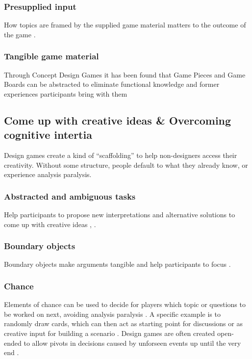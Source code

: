 \documentclass[draft,twoside]{vutinfth}
\begin{document}
            \subsubsection{Presupplied input}
            How topics are framed by the supplied game material matters to the outcome of the game \cite{brandtFormattingDesignDialogues2008}. 

            \subsubsection{Tangible game material}
            Through Concept Design Games it has been found that Game Pieces and Game Boards can be abstracted to 
            eliminate functional knowledge and former experiences participants bring with them \cite{brandtDesigningExploratoryDesign2006}

        \subsection{Come up with creative ideas \& Overcoming cognitive intertia}
        Design games create a kind of ``scaffolding'' to help non-designers access their creativity. 
        Without some structure, people default to what they already know, or experience analysis paralysis. 

            \subsubsection{Abstracted and ambiguous tasks}
            Help participants to propose new interpretations and alternative solutions to come up with 
            creative ideas \cite{vaajakallioDesignGamesCodesign2014}, \cite{bunaesRulesPlayBalance2024}. 

            \subsubsection{Boundary objects}
            Boundary objects make arguments tangible and help participants to focus \cite{brandtFacilitatingCollaborationDesign2004a}. 
            
            \subsubsection{Chance}
            Elements of chance can be used to decide for players which topic or questions to be worked on next, 
            avoiding analysis paralysis \cite{hatamiFacilitatingServiceInteractions2016}. A specific example is to randomly 
            draw cards, which can then act as starting point for discussions or as creative input for building a scenario 
            \cite{bunaesRulesPlayBalance2024}. Design games are often created open-ended to allow pivots in decisions caused by 
            unforseen events up until the very end \cite{fikarGroundedTheoryZur2023}. 
\end{document}
